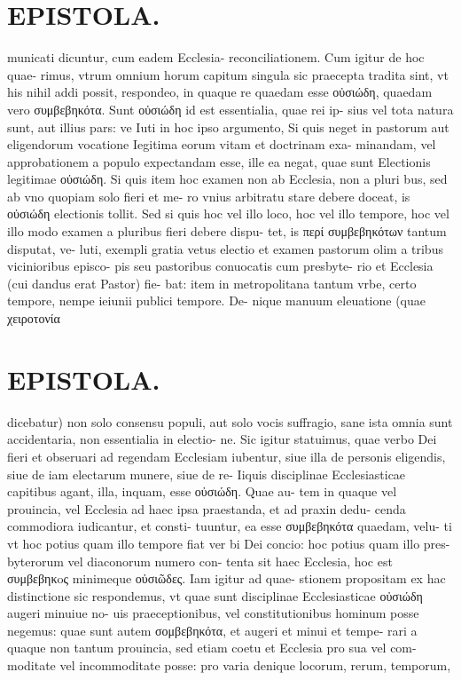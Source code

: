 \documentclass{article}
\begin{document}
\begin{pages}
\section*{EPISTOLA. }\pstart municati dicuntur, cum eadem Ecclesia- reconciliationem. Cum igitur de hoc quae- rimus, vtrum omnium horum capitum singula sic praecepta tradita sint, vt his nihil addi possit, respondeo, in quaque re quaedam esse οὐσιώδη, quaedam vero συμβεβηκότα. Sunt οὐσιώδη id est essentialia, quae rei ip- sius vel tota natura sunt, aut illius pars: ve Iuti in hoc ipso argumento, Si quis neget in pastorum aut eligendorum vocatione Iegitima eorum vitam et doctrinam exa- minandam, vel approbationem a populo expectandam esse, ille ea negat, quae sunt Electionis legitimae οὐσιώδη. Si quis item hoc examen non ab Ecclesia, non a pluri bus, sed ab vno quopiam solo fieri et me- ro vnius arbitratu stare debere doceat, is οὐσιώδη electionis tollit. Sed si quis hoc vel illo loco, hoc vel illo tempore, hoc vel illo modo examen a pluribus  fieri debere dispu- tet, is περί συμβεβηκότων tantum disputat, ve- luti, exempli gratia vetus electio et examen pastorum olim a tribus vicinioribus episco- pis seu pastoribus conuocatis cum presbyte- rio et Ecclesia (cui dandus erat Pastor) fie- bat: item in metropolitana tantum vrbe, certo tempore, nempe ieiunii publici tempore. De- nique manuum eleuatione (quae χειροτονία  \pend
\section*{EPISTOLA. }\pstart dicebatur) non solo consensu populi, aut solo vocis suffragio, sane ista omnia sunt accidentaria, non essentialia in electio- ne. Sic igitur statuimus, quae verbo Dei fieri et obseruari ad regendam Ecclesiam iubentur, siue illa de personis eligendis, siue de iam electarum munere, siue de re- Iiquis disciplinae Ecclesiasticae capitibus agant, illa, inquam, esse οὐσιώδη. Quae au- tem in quaque vel prouincia, vel Ecclesia ad haec ipsa praestanda, et ad praxin dedu- cenda commodiora iudicantur, et consti- tuuntur, ea esse συμβεβηκότα quaedam, velu- ti vt hoc potius quam illo tempore fiat ver bi Dei concio: hoc potius quam illo pres- byterorum vel diaconorum numero con- tenta sit haec Ecclesia, hoc est συμβεβηκoς minimeque οὐσιῶδες. Iam igitur ad quae- stionem propositam ex hac distinctione sic respondemus, vt quae sunt disciplinae Ecclesiasticae οὐσιώδη augeri minuiue no- uis praeceptionibus, vel constitutionibus hominum posse negemus: quae sunt autem σομβεβηκότα, et augeri et minui et tempe- rari a quaque non tantum prouincia, sed etiam coetu et Ecclesia pro sua vel com- moditate vel incommoditate posse: pro varia denique locorum, rerum, temporum,  \pend

\end{pages}
\end{document}
